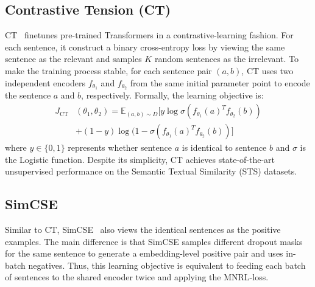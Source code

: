 \documentclass[11pt]{article}
\begin{document}
\subsection{Contrastive Tension (CT)}
CT~\citep{carlsson2021semantic} finetunes pre-trained Transformers in a contrastive-learning fashion. For each sentence, it construct a binary cross-entropy loss by viewing the same sentence as the relevant and samples $K$ random sentences as the irrelevant.  To make the training process stable, for each sentence pair $(a, b)$, CT uses two independent encoders $f_{\theta_1}$ and $f_{\theta_2}$ from the same initial parameter point to encode the sentence $a$ and $b$, respectively. Formally, the learning objective is:
\begin{align*}
J_{\mathrm{CT}}&(\theta_1, \theta_2) = \mathbb{E}_{(a, b)\sim D}[y\log\sigma(f_{\theta_1}(a)^Tf_{\theta_2}(b)) \\ 
                        & +(1-y)\log(1-\sigma(f_{\theta_1}(a)^Tf_{\theta_2}(b))]
\end{align*}
where $y\in \{0, 1\}$ represents whether sentence $a$ is identical to sentence $b$ and $\sigma$ is the Logistic function. Despite its simplicity, CT achieves state-of-the-art unsupervised performance on the Semantic Textual Similarity (STS) datasets.

\subsection{SimCSE}
Similar to CT, SimCSE~\citep{gao2021simcse} also views the identical sentences as the positive examples. The main difference is that SimCSE samples different dropout masks for the same sentence to generate a embedding-level positive pair and uses in-batch negatives. Thus, this learning objective is equivalent to feeding each batch of sentences to the shared encoder twice and applying the MNRL-loss. 
\end{document}
